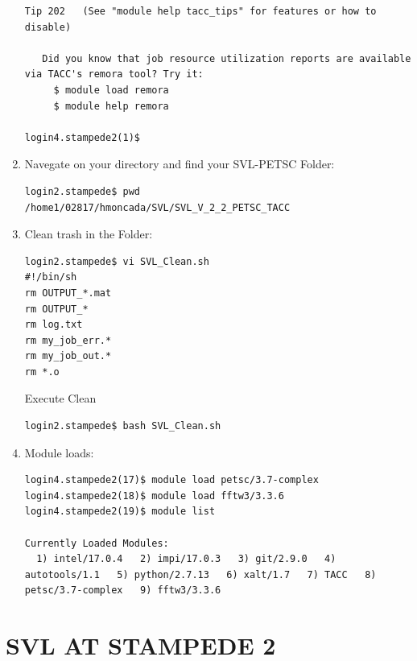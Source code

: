 \documentclass{article}
\begin{document}
\begin{enumerate}
\begin{verbatim}
Tip 202   (See "module help tacc_tips" for features or how to disable)

   Did you know that job resource utilization reports are available via TACC's remora tool? Try it:
     $ module load remora
     $ module help remora

login4.stampede2(1)$ 
\end{verbatim}
\normalsize
\item Navegate on your directory and find your SVL-PETSC Folder:
\scriptsize
\begin{verbatim}
login2.stampede$ pwd
/home1/02817/hmoncada/SVL/SVL_V_2_2_PETSC_TACC
\end{verbatim}
\normalsize
\item Clean trash in the Folder:
\scriptsize
\begin{verbatim}
login2.stampede$ vi SVL_Clean.sh
#!/bin/sh
rm OUTPUT_*.mat
rm OUTPUT_*
rm log.txt
rm my_job_err.*
rm my_job_out.*
rm *.o
\end{verbatim}
\normalsize
Execute Clean
\scriptsize
\begin{verbatim}
login2.stampede$ bash SVL_Clean.sh
\end{verbatim}
\normalsize
\item Module loads:
\scriptsize
\begin{verbatim}
login4.stampede2(17)$ module load petsc/3.7-complex
login4.stampede2(18)$ module load fftw3/3.3.6 
login4.stampede2(19)$ module list

Currently Loaded Modules:
  1) intel/17.0.4   2) impi/17.0.3   3) git/2.9.0   4) autotools/1.1   5) python/2.7.13   6) xalt/1.7   7) TACC   8) petsc/3.7-complex   9) fftw3/3.3.6
\end{verbatim}
\normalsize
\end{enumerate}


\section{SVL AT STAMPEDE 2}    
\end{document}
